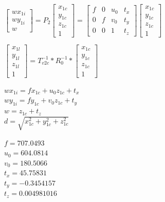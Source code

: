 \begin{center}
$
\begin{bmatrix}
wx_{1i}\\wy_{1i}\\w
\end{bmatrix}
= P_2
\begin{bmatrix}
x_{1c}\\y_{1c}\\z_{1c}\\1
\end{bmatrix} = 
\begin{bmatrix}
f&0&u_0&t_x\\0&f&v_0&t_y\\0&0&1&t_z
\end{bmatrix}
\begin{bmatrix}
x_{1c}\\y_{1c}\\z_{1c}\\1
\end{bmatrix}
$
\end{center}

\begin{center}
$
\begin{bmatrix}
x_{1l}\\y_{1l}\\z_{1l}\\1
\end{bmatrix}
= T_{v2c}^{-1} * R_0^{-1} *
\begin{bmatrix}
x_{1c}\\y_{1c}\\z_{1c}\\1
\end{bmatrix}
$
\end{center}

\begin{center}
$wx_{1i} = f x_{1c} + u_0 z_{1c} + t_x$\\
$wy_{1i} = f y_{1c} + v_0 z_{1c} + t_y$\\
$w = z_{1c} + t_z$\\
$d = \sqrt{x_{1c}^2 + y_{1c}^2 + z_{1c}^2}$
\end{center}

\begin{center}
$f = 707.0493$\\
$u_0 = 604.0814$\\
$v_0 = 180.5066$\\
$t_x = 45.75831$\\
$t_y = -0.3454157$\\
$t_z = 0.004981016$
\end{center}

